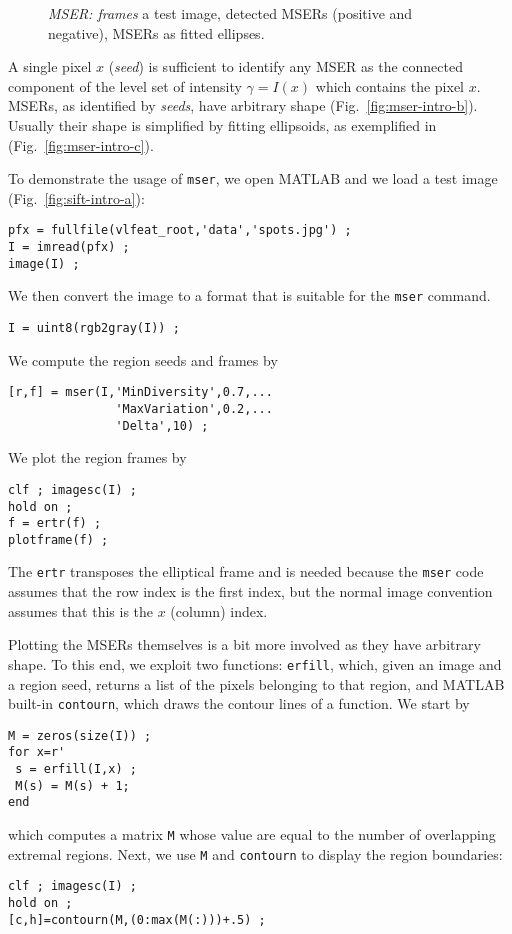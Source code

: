 \documentclass[9pt]{article}
\newcommand{\cmd}  [1]{{\color{red}\tt   #1}}
\begin{document}
\begin{figure*}[t]
\hfill
{}
\hfill
{}
\caption{{\em MSER: frames} \protect{} a test
  image, \protect{} detected MSERs (positive
  and negative), \protect{} MSERs as fitted
  ellipses.}
\label{fig:mser-intro}
\end{figure*}

A single pixel $x$ ({\em seed}) is sufficient to identify any MSER as
the connected component of the level set of intensity $\gamma=I(x)$
which contains the pixel $x$. MSERs, as identified by {\em seeds},
have arbitrary shape (Fig.~\ref{fig:mser-intro-b}). Usually their
shape is simplified by fitting ellipsoids, as exemplified in
(Fig.~\ref{fig:mser-intro-c}).

To demonstrate the usage of \cmd{mser}, we open MATLAB and we load a
test image (Fig.~\ref{fig:sift-intro-a}):
\begin{verbatim}
pfx = fullfile(vlfeat_root,'data','spots.jpg') ;
I = imread(pfx) ;
image(I) ; 
\end{verbatim}
We then convert the image to a format that is suitable for the
\cmd{mser} command.
\begin{verbatim}
I = uint8(rgb2gray(I)) ;
\end{verbatim}
We compute the region seeds and frames by
\begin{verbatim}
[r,f] = mser(I,'MinDiversity',0.7,...
               'MaxVariation',0.2,...
               'Delta',10) ;
\end{verbatim}
We plot the region frames by
\begin{verbatim}
clf ; imagesc(I) ; 
hold on ;
f = ertr(f) ;
plotframe(f) ;
\end{verbatim}
The \cmd{ertr} transposes the elliptical frame and is needed because
the \cmd{mser} code assumes that the row index is the first index, but
the normal image convention assumes that this is the $x$ (column)
index.

Plotting the MSERs themselves is a bit more involved as they have
arbitrary shape.  To this end, we exploit two functions: \cmd{erfill},
which, given an image and a region seed, returns a list of the pixels
belonging to that region, and MATLAB built-in \cmd{contourn}, which
draws the contour lines of a function. We start by
\begin{verbatim}
M = zeros(size(I)) ;
for x=r'
 s = erfill(I,x) ;
 M(s) = M(s) + 1;
end
\end{verbatim}
which computes a matrix \verb$M$ whose value are equal to the number
of overlapping extremal regions. Next, we use \verb$M$ and
\cmd{contourn} to display the region boundaries:
\begin{verbatim}
clf ; imagesc(I) ;
hold on ;
[c,h]=contourn(M,(0:max(M(:)))+.5) ;
\end{verbatim}
\end{document}
